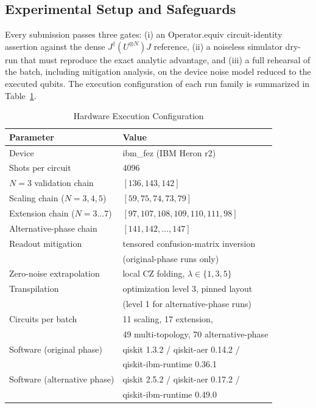 \subsection{Experimental Setup and Safeguards}
Every submission passes three gates: (i) an $\mathrm{Operator.equiv}$
circuit-identity assertion against the dense
$J^\dagger (U^{\otimes N}) J$ reference, (ii) a noiseless simulator dry-run
that must reproduce the exact analytic advantage, and (iii) a full rehearsal
of the batch, including mitigation analysis, on the device noise model reduced
to the executed qubits. The execution
configuration of each run family is summarized in Table~\ref{tab:hwconfig}.

\begin{table}[t]
\centering
\caption{Hardware Execution Configuration}
\label{tab:hwconfig}
\footnotesize
\begin{tabular}{@{}ll@{}}
\toprule
\textbf{Parameter} & \textbf{Value}\\
\midrule
Device & ibm\_fez (IBM Heron r2)\\
Shots per circuit & 4096\\
$N=3$ validation chain & $[136,143,142]$\\
Scaling chain ($N=3,4,5$) & $[59,75,74,73,79]$\\
Extension chain ($N=3\ldots7$) & $[97,107,108,109,110,111,98]$\\
Alternative-phase chain & $[141,142,\ldots,147]$\\
Readout mitigation & tensored confusion-matrix inversion\\
 & (original-phase runs only)\\
Zero-noise extrapolation & local CZ folding, $\lambda\in\{1,3,5\}$\\
Transpilation & optimization level 3, pinned layout\\
 & (level 1 for alternative-phase runs)\\
Circuits per batch & 11 scaling, 17 extension,\\
 & 49 multi-topology, 70 alternative-phase\\
Software (original phase) & qiskit 1.3.2 / qiskit-aer 0.14.2 /\\
 & qiskit-ibm-runtime 0.36.1\\
Software (alternative phase) & qiskit 2.5.2 / qiskit-aer 0.17.2 /\\
 & qiskit-ibm-runtime 0.49.0\\
\bottomrule
\end{tabular}
\end{table}
